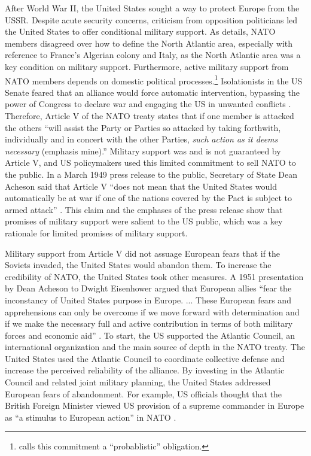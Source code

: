 \documentclass[12pt]{article}
\begin{document}
After World War II, the United States sought a way to protect Europe from the USSR. 
Despite acute security concerns, criticism from opposition politicians led the United States to offer conditional military support. 
As \citet{Poast2019a} details, NATO members disagreed over how to define the North Atlantic area, especially with reference to France's Algerian colony and Italy, as the North Atlantic area was a key condition on military support. 
Furthermore, active military support from NATO members depends on domestic political processes.\footnote{\citet{Benson2012} calls this commitment a ``probablistic'' obligation.} 
Isolationists in the US Senate feared that an alliance would force automatic intervention, bypassing the power of Congress to declare war and engaging the US in unwanted conflicts \citep[pg. 280-1]{Acheson1969}.
Therefore, Article V of the NATO treaty states that if one member is attacked the others ``will assist the Party or Parties so attacked by taking forthwith, individually and in concert with the other Parties, \emph{such action as it deems necessary} (emphasis mine).'' 
Military support was and is not guaranteed by Article V, and US policymakers used this limited commitment to sell NATO to the public. 
In a March 1949 press release to the public, Secretary of State Dean Acheson said that Article V ``does not mean that the United States would automatically be at war if one of the nations covered by the Pact is subject to armed attack'' \citep{Acheson1949}.
This claim and the emphases of the press release show that promises of military support were salient to the US public, which was a key rationale for limited promises of military support. 


Military support from Article V did not assuage European fears that if the Soviets invaded, the United States would abandon them.
To increase the credibility of NATO, the United States took other measures.  
A 1951 presentation by Dean Acheson to Dwight Eisenhower argued that European allies ``fear the inconstancy of United States purpose in Europe. ... These European fears and apprehensions can only be overcome if we move forward with determination and if we make the necessary full and active contribution in terms of both military forces and economic aid'' \citep[pg. 3]{Acheson1951}. 
To start, the US supported the Atlantic Council, an international organization and the main source of depth in the NATO treaty. 
The United States used the Atlantic Council to coordinate collective defense and increase the perceived reliability of the alliance. 
By investing in the Atlantic Council and related joint military planning, the United States addressed European fears of abandonment. 
For example, US officials thought that the British Foreign Minister viewed US provision of a supreme commander in Europe as ``a stimulus to European action'' in NATO \citep{Acheson1950}. 
\end{document}
